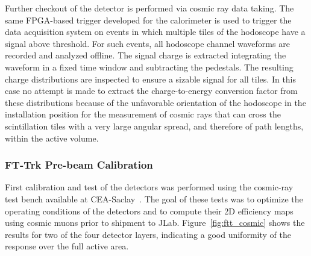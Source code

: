 Further checkout of the detector is performed via cosmic ray data taking. The same FPGA-based trigger developed
for the calorimeter is used to trigger the data acquisition system on events in which multiple tiles of the hodoscope
have a signal above threshold. For such events, all hodoscope channel waveforms are recorded and analyzed offline.
The signal charge is extracted integrating the waveform in a fixed time window and subtracting the pedestals. The
resulting charge distributions are inspected to ensure a sizable signal for all tiles. In this case no attempt is made to
extract the charge-to-energy conversion factor from these distributions because of the unfavorable orientation of
the hodoscope in the installation position for the measurement of cosmic rays that can cross the scintillation tiles with
a very large angular spread, and therefore of path lengths, within the active volume.

\subsubsection{FT-Trk Pre-beam Calibration}

First calibration and test of the detectors was performed using the cosmic-ray test bench available at
CEA-Saclay~\cite{mm}. The goal of these tests was to optimize the operating conditions of the detectors and to
compute their 2D efficiency maps using cosmic muons prior to shipment to JLab. Figure~\ref{fig:ftt_cosmic} shows
the results for two of the four detector layers, indicating a good uniformity of the response over the full active area.

